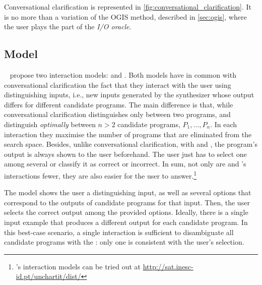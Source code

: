 Conversational clarification is represented in \autoref{fig:conversational_clarification}. It is no more than a variation of the \ac{OGIS} method, described in \autoref{sec:ogis}, where the user plays the part of the \textit{I/O oracle}.


\subsection{\optmodel Model}\label{sec:rel-ramos-interaction}

\citeauthor{UnchartIt20}~\cite{UnchartIt20,unchartit-webpage} propose two interaction models: \optmodel and \ynmodel.
Both models have in common with conversational clarification the fact that they interact with the user using distinguishing inputs, i.e., new inputs generated by the synthesizer whose output differs for different candidate programs. 
The main difference is that, while conversational clarification distinguishes only between two programs, \optmodel and \ynmodel distinguish \textit{optimally} between \(n > 2\) candidate programs, \(P_1, ..., P_n\).
In each interaction they maximise the number of programs that are eliminated from the search space. Besides, unlike conversational clarification, with \optmodel and \ynmodel, the program's output is always shown to the user beforehand.
The user just has to select one among several or classify it as correct or incorrect.
In sum, not only are \optmodel and \ynmodel's interactions fewer, they are also easier for the user to answer.\footnote{\UnchartIt's interaction models can be tried out at \url{http://sat.inesc-id.pt/unchartit/dist/}}

The \optmodel model shows the user a distinguishing input, as well as several options that correspond to the outputs of candidate programs for that input. Then, the user selects the correct output among the provided options.
Ideally, there is a single input example that produces a different output for each candidate program.
In this best-case scenario, a single interaction is sufficient to disambiguate all candidate programs with the \optmodel: only one is consistent with the user's selection.

